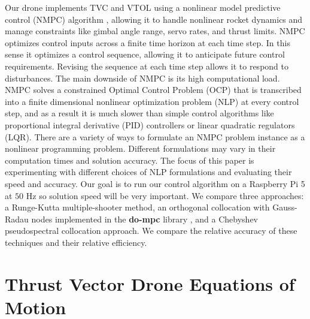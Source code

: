\documentclass[]{article}
\begin{document}
	Our drone implements TVC and VTOL using a nonlinear model predictive control (NMPC) algorithm \citep{nmpc}, allowing it to handle nonlinear rocket dynamics and manage constraints like gimbal angle range, servo rates, and thrust limits. NMPC optimizes control inputs across a finite time horizon at each time step. In this sense it optimizes a control sequence, allowing it to anticipate future control requirements. Revising the sequence at each time step allows it to respond to disturbances. The main downside of NMPC is its high computational load. NMPC solves a constrained Optimal Control Problem (OCP) that is transcribed into a finite dimensional nonlinear optimization problem (NLP) at every control step, and as a result it is much slower than simple control algorithms like proportional integral derivative (PID) controllers or linear quadratic regulators (LQR).
	There are a variety of ways to formulate an NMPC problem instance as a nonlinear programming problem. Different formulations may vary in their computation times and solution accuracy. The focus of this paper is experimenting with different choices of NLP formulations and evaluating their speed and accuracy.  Our goal is to run our control algorithm on a Raspberry Pi 5 at $50$ Hz so solution speed will be very important.
	We  compare three approaches: a Runge-Kutta multiple-shooter method, an orthogonal collocation with Gauss-Radau nodes implemented in the {\bf do-mpc}  library \citep{do-mpc},  and a Chebyshev pseudospectral collocation approach. We compare the relative accuracy of these techniques and their relative efficiency.

	

	
\section*{Thrust Vector Drone Equations of Motion}
	
\end{document}
